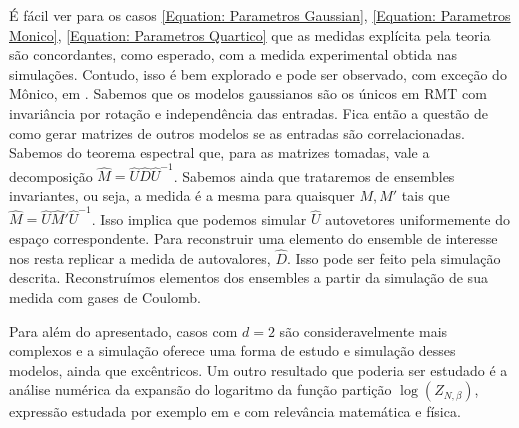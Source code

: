 \documentclass[11pt,twocolumn]{article}
\newcommand{\matriz}[1]{\hat#1}
\numberwithin{equation}{section} %
\begin{document}
É fácil ver para os casos \ref{Equation: Parametros Gaussian}, \ref{Equation: Parametros Monico}, \ref{Equation: Parametros Quartico} que as medidas explícita pela teoria são concordantes, como esperado, com a medida experimental obtida nas simulações. Contudo, isso é bem explorado e pode ser observado, com exceção do Mônico, em \cite{Chafa2018}. Sabemos que os modelos gaussianos são os únicos em RMT com invariância por rotação e independência das entradas. Fica então a questão de como gerar matrizes de outros modelos se as entradas são correlacionadas. Sabemos do teorema espectral que, para as matrizes tomadas, vale a decomposição $\matriz{M} = \matriz{U} \matriz{D} \matriz{U}^{-1}$. Sabemos ainda que trataremos de ensembles invariantes, ou seja, a medida é a mesma para quaisquer $M, M'$ tais que $\matriz{M} = \matriz{U} \matriz{M'} \matriz{U}^{-1}$. Isso implica que podemos simular $\matriz{U}$ autovetores uniformemente do espaço correspondente. Para reconstruir uma elemento do ensemble de interesse nos resta replicar a medida de autovalores, $\matriz{D}$. Isso pode ser feito pela simulação descrita. Reconstruímos elementos dos ensembles a partir da simulação de sua medida com gases de Coulomb.

Para além do apresentado, casos com $d = 2$ são consideravelmente mais complexos e a simulação oferece uma forma de estudo e simulação desses modelos, ainda que excêntricos. Um outro resultado que poderia ser estudado é a análise numérica da expansão do logaritmo da função partição $\log{(Z_{N,\beta})}$, expressão estudada por exemplo em \cite{Byun_2023} e com relevância matemática e física.




% 

\end{document}
